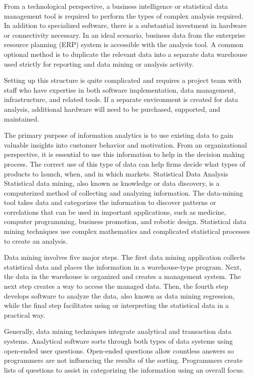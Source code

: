 From a technological perspective, a business intelligence or statistical data management tool is required to perform the types of complex analysis required. In addition to specialized software, there is a substantial investment in hardware or connectivity necessary. In an ideal scenario, business data from the enterprise resource planning (ERP) system is accessible with the analysis tool. A common optional method is to duplicate the relevant data into a separate data warehouse used strictly for reporting and data mining or analysis activity.
 
Setting up this structure is quite complicated and requires a project team with staff who have expertise in both software implementation, data management, infrastructure, and related tools. If a separate environment is created for data analysis, additional hardware will need to be purchased, supported, and maintained.
 
The primary purpose of information analytics is to use existing data to gain valuable insights into customer behavior and motivation. From an organizational perspective, it is essential to use this information to help in the decision making process. The correct use of this type of data can help firms decide what types of products to launch, when, and in which markets.
Statistical Data Analysis
Statistical data mining, also known as knowledge or data discovery, is a computerized method of collecting and analyzing information. The data-mining tool takes data and categorizes the information to discover patterns or correlations that can be used in important applications, such as medicine, computer programming, business promotion, and robotic design. Statistical data mining techniques use complex mathematics and complicated statistical processes to create an analysis.
 
Data mining involves five major steps. The first data mining application collects statistical data and places the information in a warehouse-type program. Next, the data in the warehouse is organized and creates a management system. The next step creates a way to access the managed data. Then, the fourth step develops software to analyze the data, also known as data mining regression, while the final step facilitates using or interpreting the statistical data in a practical way.
 
Generally, data mining techniques integrate analytical and transaction data systems. Analytical software sorts through both types of data systems using open-ended user questions. Open-ended questions allow countless answers so programmers are not influencing the results of the sorting. Programmers create lists of questions to assist in categorizing the information using an overall focus.
 
